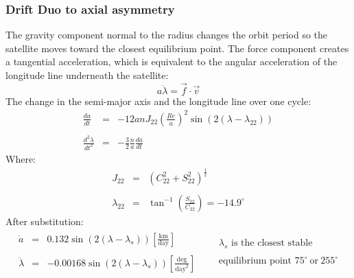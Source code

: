 \documentclass[12pt, a4paper]{article}
\begin{document}
\subsubsection{Drift Duo to axial asymmetry}
The gravity component normal to the radius changes the orbit period so the satellite moves toward the closest equilibrium point. The force component creates a tangential acceleration, which is equivalent to the angular acceleration of the longitude line underneath the satellite:
\begin{equation}
    a\ddot{\lambda}=\vec{f}\cdot\vec{v}
\end{equation}
The change in the semi-major axis and the longitude line over one cycle:
\begin{equation}
    \begin{array}{rcl}
        \displaystyle\frac{da}{dt}&=&\displaystyle-12anJ_{22}\left(\frac{Re}{a}\right)^2\sin\left(2\left(\lambda-\lambda_{22}\right)\right) \\\\
        \displaystyle\frac{d^2\lambda}{dt^2}&=&\displaystyle-\frac{3}{2}\frac{n}{a}\frac{da}{dt}
    \end{array}
\end{equation}
Where:
\begin{equation}
    \begin{array}{rcl}
        \displaystyle J_{22}&=&\displaystyle\left(C_{22}^2+S_{22}^2\right)^{\frac{1}{2}} \\\\
        \displaystyle\lambda_{22}&=&\displaystyle\tan^{-1}\left(\frac{S_{22}}{C_{22}}\right)=-14.9^\circ
    \end{array}
\end{equation}
After substitution:
\begin{equation}
    \begin{matrix}
        \begin{array}{rcl}
            \dot{a}&=&\displaystyle0.132\sin\left(2\left(\lambda-\lambda_s\right)\right)\left[\frac{\mathrm{km}}{\mathrm{day}}\right] \\\\
            \ddot{\lambda}&=&\displaystyle-0.00168\sin\left(2\left(\lambda-\lambda_s\right)\right)\left[\frac{\mathrm{deg}}{\mathrm{day}^2}\right]
        \end{array} && \substack{\displaystyle\lambda_s\text{ is the closest stable}\\\\\displaystyle\text{equilibrium point }75^\circ\ \mathrm{or}\ 255^\circ}
    \end{matrix}
\end{equation}
\end{document}
